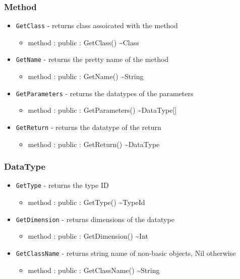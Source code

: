 \documentclass[12pt]{article}
\begin{document}
\subsubsection{Method}
\begin{itemize}

\item \texttt{GetClass} - returns class assoicated with the method
  \begin{itemize}
  \item method : public : GetClass() \textasciitilde Class
  \end{itemize}

\item \texttt{GetName} - returns the pretty name of the method
  \begin{itemize}
  \item method : public : GetName() \textasciitilde String
  \end{itemize}

\item \texttt{GetParameters} - returns the datatypes of the parameters
  \begin{itemize}
  \item method : public : GetParameters() \textasciitilde DataType[]
  \end{itemize}

\item \texttt{GetReturn} - returns the datatype of the return
  \begin{itemize}
  \item method : public : GetReturn() \textasciitilde DataType
  \end{itemize}
\end{itemize}

\subsubsection{DataType}
\begin{itemize}

\item \texttt{GetType} - returns the type ID
  \begin{itemize}
  \item method : public : GetType() \textasciitilde TypeId
  \end{itemize}

\item \texttt{GetDimension} - returns dimensions of the datatype
  \begin{itemize}
  \item method : public : GetDimension() \textasciitilde Int
  \end{itemize}

\item \texttt{GetClassName} - returns string name of non-basic
  objects, Nil otherwise
  \begin{itemize}
  \item method : public : GetClassName() \textasciitilde String
  \end{itemize}
\end{itemize}
\end{document}
